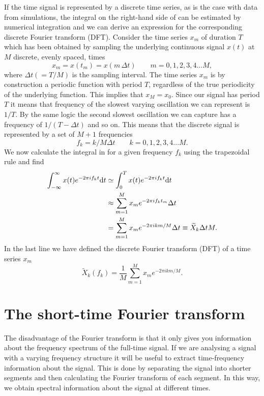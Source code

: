 If the time signal is represented by a discrete time series, as is the case with data from simulations,
the integral on the right-hand side of  can be estimated by numerical integration and 
we can derive an expression for the corresponding discrete Fourier transform (DFT).
Consider the time series $x_m$ of duration $T$ which has been obtained by sampling the underlying 
continuous signal $x(t)$ at $M$ discrete, evenly spaced, times
\begin{equation}
x_m = x(t_m) = x(m \, \Delta t) \qquad m = 0,1,2,3,4 ... M,
\end{equation} 
where $\Delta t( = T/M)$ is the sampling interval.
The time series $x_m$ is by construction a periodic function with period $T$, regardless of the true periodicity of the
underlying function. This implies that $x_M = x_0$. Since our signal has period $T$ it means that frequency
of the slowest varying oscillation we can represent is $1/T$. By the same logic the second slowest oscillation 
we can capture has a frequency of $1/(T-\Delta t)$ and so on. This means that the discrete signal
is represented by a set of $M+1$ frequencies 
\begin{equation}
f_k = k/M \Delta t \qquad k = 0,1,2,3,4 ... M.
\end{equation}
We now calculate the integral in  for a given frequency $f_k$ using the trapezoidal rule and find
\begin{align} 
\int_{-\infty}^{\infty} x(t) e^{-2 \pi i f_k t} \mathrm{d} t &\simeq \int_{0}^{T} x(t) e^{-2 \pi i f_k t} \mathrm{d} t \nonumber \\
&\approx \sum_{m=1}^{M} x_m e^{-2 \pi i f_k t_m} \Delta t \nonumber \\
& = \sum_{m=1}^{M} x_m e^{-2 \pi i k m/M} \Delta t \equiv \widetilde{X}_k \Delta t M. \label{eqSA:dft1}
\end{align}
In the last line we have defined the discrete Fourier transform (DFT) of a time series $x_m$
\begin{equation} \label{eqSA:DFT}
\widetilde{X}_k (f_k) = \frac{1}{M}  \sum^M_{m=1} x_m e^{-2\pi i k m/M}.
\end{equation}

\section{The short-time Fourier transform}
The disadvantage of the Fourier transform is that it only gives you information
about the frequency spectrum of the full-time signal. If we are analysing a 
signal with a varying frequency structure it will be useful to extract time-frequency information about the signal. This is done by separating
the signal into shorter segments and then calculating the Fourier transform of each
segment. In this way, we obtain spectral information about the
signal at different times.

